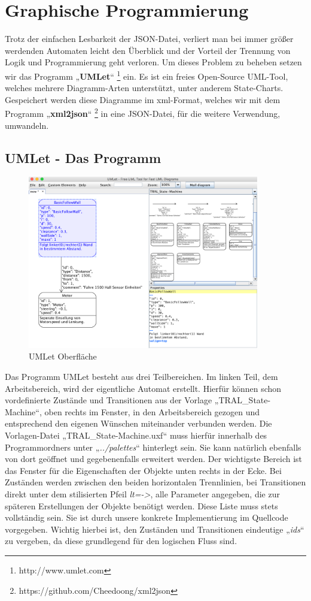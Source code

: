 \section{Graphische Programmierung}
\label{sec:graphischeprogrammierung}

Trotz der einfachen Lesbarkeit der JSON-Datei, verliert man bei immer größer
werdenden Automaten leicht den Überblick und der Vorteil der Trennung von Logik
und Programmierung geht verloren. Um dieses Problem zu beheben setzen wir das
Programm „\textbf{UMLet}“ \footnote[1]{http://www.umlet.com} ein. Es ist ein freies Open-Source UML-Tool, welches mehrere
Diagramm-Arten unterstützt, unter anderem State-Charts. Gespeichert werden
diese Diagramme im xml-Format, welches wir mit dem Programm „\textbf{xml2json}“ \footnote[2]{https://github.com/Cheedoong/xml2json}
in eine JSON-Datei, für die weitere Verwendung, umwandeln.
\subsection{UMLet - Das Programm}
\begin{figure}[ht]
\centering 
\includegraphics[width=0.90\textwidth]{images/umlet-bsp.png} 
\caption{UMLet Oberfläche}
\label{fig:umlet}
\end{figure}

Das Programm UMLet besteht aus drei Teilbereichen. Im linken Teil, dem
Arbeitsbereich, wird der eigentliche Automat erstellt. Hierfür können schon
vordefinierte Zustände und Transitionen aus der Vorlage „TRAL\_State-Machine“,
oben rechts im Fenster, in den Arbeitsbereich gezogen und entsprechend den eigenen Wünschen
miteinander verbunden werden. Die Vorlagen-Datei „TRAL\_State-Machine.uxf“ muss
hierfür innerhalb des Programmordners unter „\textit{../palettes}“ hinterlegt sein.
Sie kann natürlich ebenfalls von dort geöffnet und gegebenenfalls erweitert
werden.
Der wichtigste Bereich ist das Fenster für die Eigenschaften der Objekte unten rechts in der Ecke.
Bei Zuständen werden zwischen den beiden horizontalen Trennlinien, bei
Transitionen direkt unter dem stilisierten Pfeil \textit{lt=->}, alle Parameter
angegeben, die zur späteren Erstellungen der Objekte benötigt werden. Diese
Liste muss stets vollständig sein. Sie ist durch unsere konkrete
Implementierung im Quellcode vorgegeben.
Wichtig hierbei ist, den Zuständen und Transitionen eindeutige „\textit{ids}“ zu
vergeben, da diese grundlegend für den logischen Fluss sind.


